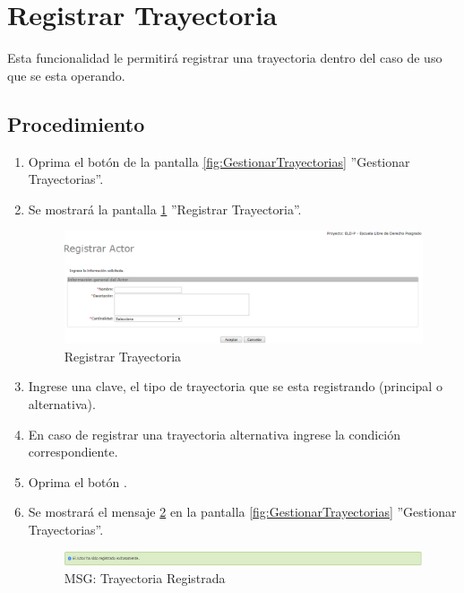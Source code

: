 
\hypertarget{cv:registrarTray}{\section{Registrar Trayectoria}} \label{sec:registrarTray}

	Esta funcionalidad le permitirá registrar una trayectoria dentro del caso de uso que se esta operando.

		\subsection{Procedimiento}

			\begin{enumerate}
	
			\item Oprima el botón \IURegistrar{} de la pantalla \ref{fig:GestionarTrayectorias} ''Gestionar Trayectorias''.
			
			\item Se mostrará la pantalla \ref{fig:registrarTray} ''Registrar Trayectoria''.

			\begin{figure}[H]
				\begin{center}
					\includegraphics[scale=0.5]{roles/lider/actor/pantallas/IU10-1registrarActor}
					\caption{Registrar Trayectoria}
					\label{fig:registrarTray}
				\end{center}
			\end{figure}
		
			\item Ingrese una clave, el tipo de trayectoria que se esta registrando (principal o alternativa).
			
			\item En caso de registrar una trayectoria alternativa ingrese la condición correspondiente. 
			
			\item Oprima el botón \IUAceptar.
			
			\item Se mostrará el mensaje \ref{fig:trayRegistrada} en la pantalla \ref{fig:GestionarTrayectorias} ''Gestionar Trayectorias''.
			
			\begin{figure}[htbp!]
				\begin{center}
					\includegraphics[scale=0.5]{roles/lider/actor/pantallas/IU10-1MSG1}
					\caption{MSG: Trayectoria Registrada}
					\label{fig:trayRegistrada}
				\end{center}
			\end{figure}
			\end{enumerate}